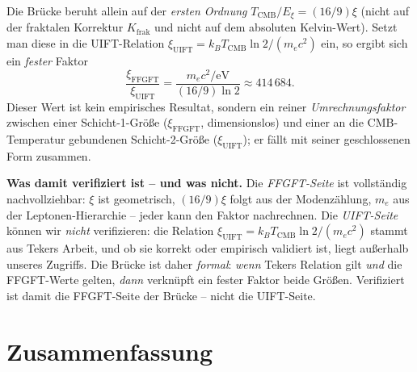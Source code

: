 Die Brücke beruht allein auf der \emph{ersten Ordnung}
$T_{\text{CMB}}/E_\xi = (16/9)\xi$ (nicht auf der fraktalen Korrektur
$K_{\text{frak}}$ und nicht auf dem absoluten Kelvin-Wert). Setzt man diese in
die UIFT-Relation $\xi_{\text{UIFT}} = k_B T_{\text{CMB}}\ln 2/(m_e c^2)$ ein,
so ergibt sich ein \emph{fester} Faktor
\[
  \frac{\xi_{\text{FFGFT}}}{\xi_{\text{UIFT}}}
  = \frac{m_e c^2/\text{eV}}{(16/9)\ln 2} \approx 414\,684 .
\]
Dieser Wert ist kein empirisches Resultat, sondern ein reiner
\emph{Umrechnungsfaktor} zwischen einer Schicht-1-Größe ($\xi_{\text{FFGFT}}$,
dimensionslos) und einer an die CMB-Temperatur gebundenen Schicht-2-Größe
($\xi_{\text{UIFT}}$); er fällt mit seiner geschlossenen Form zusammen.

\textbf{Was damit verifiziert ist -- und was nicht.} Die \emph{FFGFT-Seite}
ist vollständig nachvollziehbar: $\xi$ ist geometrisch, $(16/9)\xi$ folgt aus
der Modenzählung, $m_e$ aus der Leptonen-Hierarchie -- jeder kann den Faktor
nachrechnen. Die \emph{UIFT-Seite} können wir \emph{nicht} verifizieren: die
Relation $\xi_{\text{UIFT}}=k_B T_{\text{CMB}}\ln 2/(m_e c^2)$ stammt aus Tekers
Arbeit, und ob sie korrekt oder empirisch validiert ist, liegt außerhalb
unseres Zugriffs. Die Brücke ist daher \emph{formal}: \emph{wenn} Tekers
Relation gilt \emph{und} die FFGFT-Werte gelten, \emph{dann} verknüpft ein
fester Faktor beide Größen. Verifiziert ist damit die FFGFT-Seite der
Brücke -- nicht die UIFT-Seite.

\section{Zusammenfassung}

